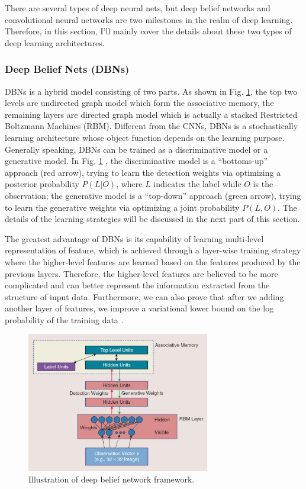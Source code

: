 \documentclass[conference]{IEEEtran}
\begin{document}
There are several types of deep neural nets, but deep belief networks and convolutional neural networks are two milestones in the realm of deep learning. Therefore, in this section, I'll mainly cover the details about these two types of deep learning architectures.

\subsubsection{Deep Belief Nets (DBNs)}


DBNs is a hybrid model consisting of two parts. As shown in Fig. \ref{fig:dbn}, the top two levels are undirected graph model which form the associative memory, the remaining layers are directed graph model which is actually a stacked Restricted Boltzmann Machines (RBM). Different from the CNNs, DBNs is a stochastically learning architecture whose object
function depends on the learning purpose. Generally speaking, DBNs can be trained as a discriminative model or a generative model. In Fig. \ref{fig:dbn} , the discriminative model is a ``bottoms-up'' approach (red arrow), trying to
learn the detection weights via optimizing a posterior probability $P(L|O)$, where $L$ indicates the label while $O$ is the observation; the generative model is a ``top-down'' approach (green arrow), trying to learn the generative weights via optimizing a joint probability $P(L,O)$. The details of the learning strategies will be discussed in the next part of this section.

The greatest advantage of DBNs is its capability of learning multi-level representation of feature, which is achieved through a layer-wise training strategy where the higher-level features are learned based on the features produced by the previous layers. Therefore, the higher-level features are believed to be more complicated and can better represent the information extracted from the structure of input data. Furthermore, we can also prove that after we adding another layer of features, we improve a variational lower bound on the log probability of the training data \cite{Hinton}.

\begin{figure}[t]
\centering
\includegraphics[width=80mm]{dbn.pdf}
\caption{Illustration of deep belief network framework\cite{new_frontier}.}
\label{fig:dbn}
\end{figure}
\end{document}
